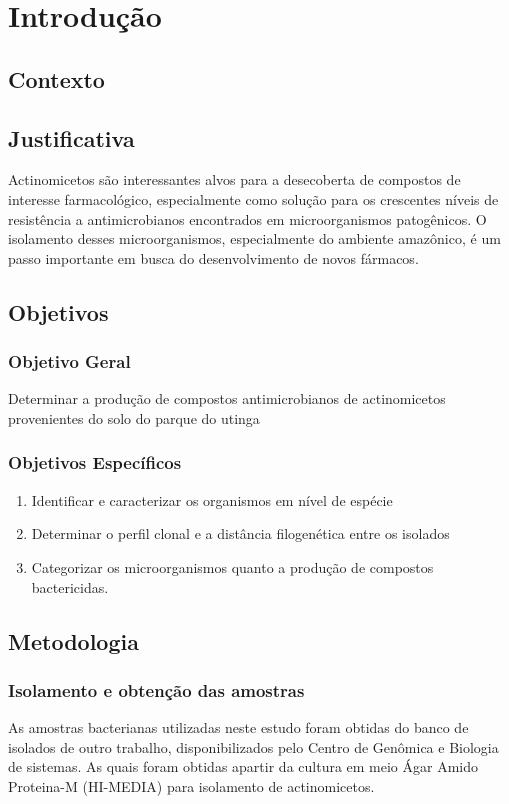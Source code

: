 \chapter{Introdução}
\label{cap:introducao}

\section{Contexto}



\section{Justificativa}
Actinomicetos são interessantes alvos para a desecoberta de compostos
de interesse farmacológico, especialmente como solução para os crescentes níveis
de resistência a antimicrobianos encontrados em microorganismos patogênicos.
O isolamento desses microorganismos, especialmente do ambiente amazônico,
é um passo importante em busca do desenvolvimento de novos fármacos.

\section{Objetivos}

\subsection{Objetivo Geral}

Determinar a produção de compostos antimicrobianos de actinomicetos
provenientes do solo do parque do utinga

\subsection{Objetivos Específicos}
\begin{enumerate}
    \item Identificar e caracterizar os organismos em nível de espécie
    \item Determinar o perfil clonal e a distância filogenética entre os isolados
    \item Categorizar os microorganismos quanto a produção de compostos bactericidas.
\end{enumerate}

\section{Metodologia}
\subsection{Isolamento e obtenção das amostras}
As amostras bacterianas utilizadas neste estudo foram obtidas do banco de isolados de outro
trabalho, disponibilizados pelo Centro de Genômica e Biologia de sistemas. As quais foram
obtidas apartir da cultura em meio Ágar Amido Proteina-M (HI-MEDIA) para isolamento de actinomicetos.

